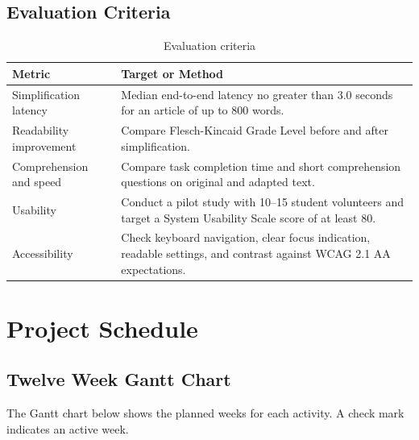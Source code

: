 \documentclass[a4paper]{tietreport}
\begin{document}
\section{Evaluation Criteria}
\begin{table}[H]
\centering
\begin{tabular}{p{} p{}}
\toprule
\textbf{Metric} & \textbf{Target or Method} \\
\midrule
Simplification latency & Median end-to-end latency no greater than 3.0 seconds for an article of up to 800 words. \\
Readability improvement & Compare Flesch-Kincaid Grade Level before and after simplification. \\
Comprehension and speed & Compare task completion time and short comprehension questions on original and adapted text. \\
Usability & Conduct a pilot study with 10--15 student volunteers and target a System Usability Scale score of at least 80. \\
Accessibility & Check keyboard navigation, clear focus indication, readable settings, and contrast against WCAG 2.1 AA expectations. \\
\bottomrule
\end{tabular}
\caption{Evaluation criteria}
\end{table}

\chapter{Project Schedule}
\section{Twelve Week Gantt Chart}
The Gantt chart below shows the planned weeks for each activity. A check mark indicates an active week.
\end{document}
